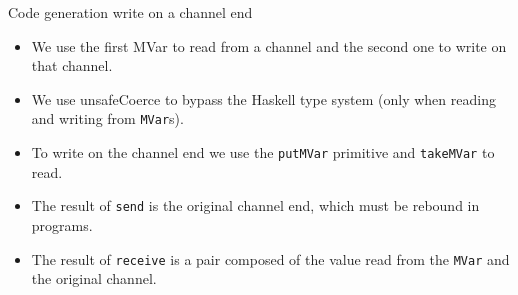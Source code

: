 \documentclass[10pt]{beamer}
\begin{document}
\begin{frame}[fragile]{Code generation \hfill {\color{mLightBrown} write on a channel end}}

\begin{tcolorbox}
\begin{itemize}
        \item We use the first MVar to read from a channel and the second one to write on that channel. \pause
	\item We use unsafeCoerce to bypass the Haskell type system (only when reading and writing from \lstinline|MVar|s). \pause
	\item To write on the channel end we use the \lstinline|putMVar| primitive and \lstinline|takeMVar| to read.\pause
	\item The result of \lstinline|send| is the original channel end, which must be rebound in programs.
        \item The result of \lstinline|receive| is a pair composed of the value read from the \lstinline|MVar| and the original channel.

\end{itemize}
\end{tcolorbox}


\end{frame}


\end{document}
